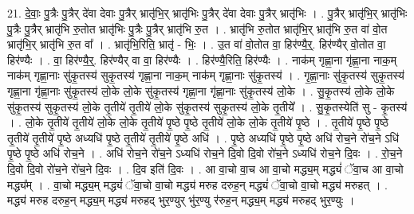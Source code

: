 \documentclass[17pt]{extarticle}
\begin{document}
21. दे॒वाः॒ पु॒त्रैः पु॒त्रैर् दे॑वा देवाः पु॒त्रैर् भ्रातृ॑भि॒र् भ्रातृ॑भिः पु॒त्रैर् दे॑वा देवाः पु॒त्रैर् भ्रातृ॑भिः । . पु॒त्रैर् भ्रातृ॑भि॒र् भ्रातृ॑भिः पु॒त्रैः पु॒त्रैर् भ्रातृ॑भि रु॒तोत भ्रातृ॑भिः पु॒त्रैः पु॒त्रैर् भ्रातृ॑भि रु॒त । . भ्रातृ॑भि रु॒तोत भ्रातृ॑भि॒र् भ्रातृ॑भि रु॒त वा॑ वो॒त भ्रातृ॑भि॒र् भ्रातृ॑भि रु॒त वा᳚ । . भ्रातृ॑भि॒रिति॒ भ्रातृ॑ - भिः॒ । . उ॒त वा॑ वो॒तोत वा॒ हिर॑ण्यै॒र्॒. हिर॑ण्यैर् वो॒तोत वा॒ हिर॑ण्यैः । . वा॒ हिर॑ण्यै॒र्॒. हिर॑ण्यैर् वा वा॒ हिर॑ण्यैः । . हिर॑ण्यै॒रिति॒ हिर॑ण्यैः । . नाक॑म् गृह्णा॒ना गृ॑ह्णा॒ना नाक॒म् नाक॑म् गृह्णा॒नाः सु॑कृ॒तस्य॑ सुकृ॒तस्य॑ गृह्णा॒ना नाक॒म् नाक॑म् गृह्णा॒नाः सु॑कृ॒तस्य॑ । . गृ॒ह्णा॒नाः सु॑कृ॒तस्य॑ सुकृ॒तस्य॑ गृह्णा॒ना गृ॑ह्णा॒नाः सु॑कृ॒तस्य॑ लो॒के लो॒के सु॑कृ॒तस्य॑ गृह्णा॒ना गृ॑ह्णा॒नाः सु॑कृ॒तस्य॑ लो॒के । . सु॒कृ॒तस्य॑ लो॒के लो॒के सु॑कृ॒तस्य॑ सुकृ॒तस्य॑ लो॒के तृ॒तीये॑ तृ॒तीये॑ लो॒के सु॑कृ॒तस्य॑ सुकृ॒तस्य॑ लो॒के तृ॒तीये᳚ । . सु॒कृ॒तस्येति॑ सु - कृ॒तस्य॑ । . लो॒के तृ॒तीये॑ तृ॒तीये॑ लो॒के लो॒के तृ॒तीये॑ पृ॒ष्ठे पृ॒ष्ठे तृ॒तीये॑ लो॒के लो॒के तृ॒तीये॑ पृ॒ष्ठे । . तृ॒तीये॑ पृ॒ष्ठे पृ॒ष्ठे तृ॒तीये॑ तृ॒तीये॑ पृ॒ष्ठे अध्यधि॑ पृ॒ष्ठे तृ॒तीये॑ तृ॒तीये॑ पृ॒ष्ठे अधि॑ । . पृ॒ष्ठे अध्यधि॑ पृ॒ष्ठे पृ॒ष्ठे अधि॑ रोच॒ने रो॑च॒ने ऽधि॑ पृ॒ष्ठे पृ॒ष्ठे अधि॑ रोच॒ने । . अधि॑ रोच॒ने रो॑च॒ने ऽध्यधि॑ रोच॒ने दि॒वो दि॒वो रो॑च॒ने ऽध्यधि॑ रोच॒ने दि॒वः । . रो॒च॒ने दि॒वो दि॒वो रो॑च॒ने रो॑च॒ने दि॒वः । . दि॒व इति॑ दि॒वः । . आ वा॒चो वा॒च आ वा॒चो मद्ध्य॒म् मद्ध्यं॑ ॅवा॒च आ वा॒चो मद्ध्य᳚म् । . वा॒चो मद्ध्य॒म् मद्ध्यं॑ ॅवा॒चो वा॒चो मद्ध्य॑ मरुह दरुह॒न् मद्ध्यं॑ ॅवा॒चो वा॒चो मद्ध्य॑ मरुहत् । . मद्ध्य॑ मरुह दरुह॒न् मद्ध्य॒म् मद्ध्य॑ मरुहद् भुर॒ण्युर् भु॑र॒ण्यु र॑रुह॒न् मद्ध्य॒म् मद्ध्य॑ मरुहद् भुर॒ण्युः । \newline
\end{document}
